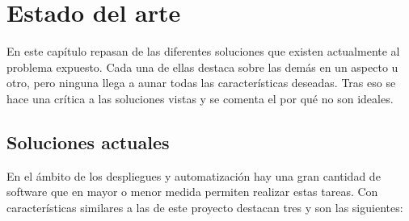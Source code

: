 \chapter{Estado del arte}

En este capítulo repasan de las diferentes soluciones que existen actualmente al problema expuesto. Cada una de ellas destaca sobre las demás en un aspecto u otro, pero ninguna llega a aunar todas las características deseadas. Tras eso se hace una crítica a las soluciones vistas y se comenta el por qué no son ideales.

\section{Soluciones actuales}

En el ámbito de los despliegues y automatización hay una gran cantidad de software que en mayor o menor medida permiten realizar estas tareas. Con características similares a las de este proyecto destacan tres y son las siguientes:

